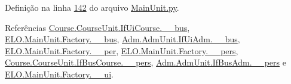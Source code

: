 Definição na linha \hyperlink{MainUnit_8py_source_l00142}{142} do arquivo \hyperlink{MainUnit_8py_source}{Main\-Unit.\-py}.



Referências \hyperlink{CourseUnit_8py_source_l00025}{Course.\-Course\-Unit.\-If\-Ui\-Course.\-\_\-\-\_\-bus}, \hyperlink{MainUnit_8py_source_l00039}{E\-L\-O.\-Main\-Unit.\-Factory.\-\_\-\-\_\-bus}, \hyperlink{AdmUnit_8py_source_l00067}{Adm.\-Adm\-Unit.\-If\-Ui\-Adm.\-\_\-\-\_\-bus}, \hyperlink{MainUnit_8py_source_l00145}{E\-L\-O.\-Main\-Unit.\-Factory.\-\_\-\-\_\-per}, \hyperlink{MainUnit_8py_source_l00040}{E\-L\-O.\-Main\-Unit.\-Factory.\-\_\-\-\_\-pers}, \hyperlink{CourseUnit_8py_source_l00051}{Course.\-Course\-Unit.\-If\-Bus\-Course.\-\_\-\-\_\-pers}, \hyperlink{AdmUnit_8py_source_l00112}{Adm.\-Adm\-Unit.\-If\-Bus\-Adm.\-\_\-\-\_\-pers} e \hyperlink{MainUnit_8py_source_l00038}{E\-L\-O.\-Main\-Unit.\-Factory.\-\_\-\-\_\-ui}.


